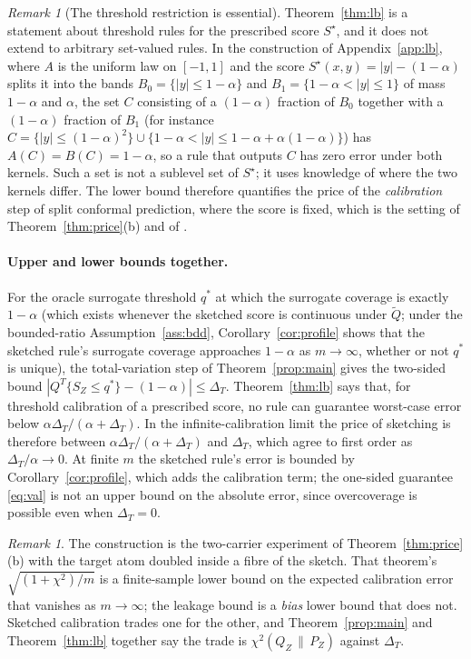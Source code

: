 \documentclass[11pt,a4paper]{article}
\newcommand{\chisqZ}{\chi^2(Q_Z\,\|\,P_Z)}
\newcommand{\abs}[1]{\left|#1\right|}
\newcommand{\Qt}{\widetilde Q}
\theoremstyle{plain}
\theoremstyle{definition}
\theoremstyle{remark}
\newtheorem{remark}[theorem]{Remark}
\begin{document}
\begin{remark}[The threshold restriction is essential]\label{rem:nonthreshold}
Theorem~\ref{thm:lb} is a statement about threshold rules for the prescribed score $S^\star$, and it does not extend to arbitrary set-valued rules. In the construction of Appendix~\ref{app:lb}, where $A$ is the uniform law on $[-1,1]$ and the score $S^\star(x,y)=|y|-(1-\alpha)$ splits it into the bands $B_0=\{|y|\le1-\alpha\}$ and $B_1=\{1-\alpha<|y|\le1\}$ of mass $1-\alpha$ and $\alpha$, the set $C$ consisting of a $(1-\alpha)$ fraction of $B_0$ together with a $(1-\alpha)$ fraction of $B_1$ (for instance $C=\{|y|\le(1-\alpha)^2\}\cup\{1-\alpha<|y|\le1-\alpha+\alpha(1-\alpha)\}$) has $A(C)=B(C)=1-\alpha$, so a rule that outputs $C$ has zero error under both kernels. Such a set is not a sublevel set of $S^\star$; it uses knowledge of where the two kernels differ. The lower bound therefore quantifies the price of the \emph{calibration} step of split conformal prediction, where the score is fixed, which is the setting of Theorem~\ref{thm:price}(b) and of \cite{isaev2026}.
\end{remark}

\paragraph{Upper and lower bounds together.}
For the oracle surrogate threshold $q^\ast$ at which the surrogate coverage is exactly $1-\alpha$ (which exists whenever the sketched score is continuous under $\Qt$; under the bounded-ratio Assumption~\ref{ass:bdd}, Corollary~\ref{cor:profile} shows that the sketched rule's surrogate coverage approaches $1-\alpha$ as $m\to\infty$, whether or not $q^\ast$ is unique), the total-variation step of Theorem~\ref{prop:main} gives the two-sided bound
$\abs{Q^T\{S_Z\le q^\ast\}-(1-\alpha)}\le\Delta_T$.
Theorem~\ref{thm:lb} says that, for threshold calibration of a prescribed score, no rule can guarantee worst-case error below $\alpha\Delta_T/(\alpha+\Delta_T)$. In the infinite-calibration limit the price of sketching is therefore between $\alpha\Delta_T/(\alpha+\Delta_T)$ and $\Delta_T$, which agree to first order as $\Delta_T/\alpha\to0$. At finite $m$ the sketched rule's error is bounded by Corollary~\ref{cor:profile}, which adds the calibration term; the one-sided guarantee \eqref{eq:val} is not an upper bound on the absolute error, since overcoverage is possible even when $\Delta_T=0$.

\begin{remark}
The construction is the two-carrier experiment of Theorem~\ref{thm:price}(b) with the target atom doubled inside a fibre of the sketch. That theorem's $\sqrt{(1+\chi^2)/m}$ is a finite-sample lower bound on the expected calibration error that vanishes as $m\to\infty$; the leakage bound is a \emph{bias} lower bound that does not. Sketched calibration trades one for the other, and Theorem~\ref{prop:main} and Theorem~\ref{thm:lb} together say the trade is $\chisqZ$ against $\Delta_T$.
\end{remark}
\end{document}
